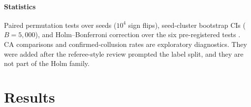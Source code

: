 \documentclass[11pt,letterpaper]{article}
\begin{document}
\paragraph{Statistics} Paired permutation tests over seeds ($10^4$ sign flips), seed-cluster bootstrap CIs ($B=5{,}000$), and Holm--Bonferroni correction over the six pre-registered tests \cite{holm1979simple}. CA comparisons and confirmed-collusion rates are exploratory diagnostics. They were added after the referee-style review prompted the label split, and they are not part of the Holm family.

\section{Results}
\end{document}
